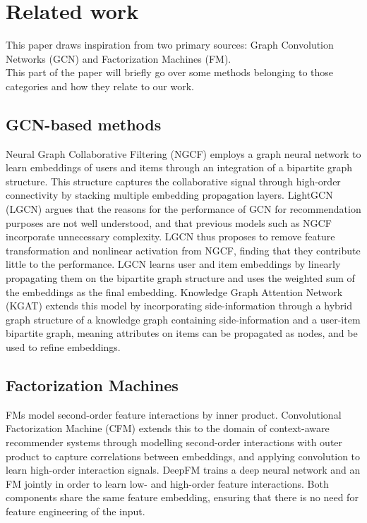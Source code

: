\section{Related work}\label{sec:relatedwork}
This paper draws inspiration from two primary sources: Graph Convolution Networks (GCN) and Factorization Machines (FM).\\
This part of the paper will briefly go over some methods belonging to those categories and how they relate to our work.

\subsection{GCN-based methods}
Neural Graph Collaborative Filtering (NGCF) \cite{NGCF} employs a graph neural network to learn embeddings of users and items through an integration of a bipartite graph structure. This structure captures the collaborative signal through high-order connectivity by stacking multiple embedding propagation layers.
LightGCN (LGCN)\cite{LightGCN} argues that the reasons for the performance of GCN for recommendation purposes are not well understood, and that previous models such as NGCF incorporate unnecessary complexity.
LGCN thus proposes to remove feature transformation and nonlinear activation from NGCF, finding that they contribute little to the performance.
LGCN learns user and item embeddings by linearly propagating them on the bipartite graph structure and uses the weighted sum of the embeddings as the final embedding.
Knowledge Graph Attention Network (KGAT)\cite{KGAT} extends this model by incorporating side-information through a hybrid graph structure of a knowledge graph containing side-information and a user-item bipartite graph, meaning attributes on items can be propagated as nodes, and be used to refine embeddings.

\subsection{Factorization Machines}
FMs \cite{fmrendle} model second-order feature interactions by inner product.
Convolutional Factorization Machine (CFM)\cite{CFM} extends this to the domain of context-aware recommender systems through modelling second-order interactions with outer product to capture correlations between embeddings, and applying convolution to learn high-order interaction signals.
DeepFM trains a deep neural network and an FM jointly in order to learn low- and high-order feature interactions. Both components share the same feature embedding, ensuring that there is no need for feature engineering of the input.
